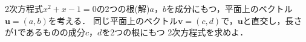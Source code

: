 \documentclass[../../main.tex]{subfiles}
\begin{document}
2次方程式$x^2+x-1=0$の2つの根(解)$a$，$b$を成分にもつ，平面上のベクトル$\mathbf{u}=(a,b)$を考える．
同じ平面上のベクトル$\mathbf{v}=(c,d)$で，$\mathbf{u}$と直交し，長さが1であるものの成分$c$，$d$を2つの根にもつ
2次方程式を求めよ．
\end{document}
